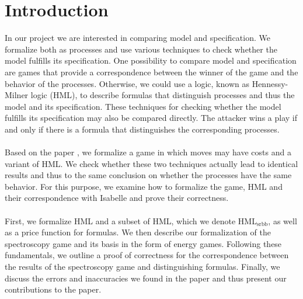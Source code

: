 \newpage
\section{Introduction}
In our project we are interested in comparing model and specification.
We formalize both as processes and use various techniques to check whether the model fulfills its specification.
One possibility to compare model and specification are games that provide a correspondence between the winner of the game and the behavior of the processes.
Otherwise, we could use a logic, known as Hennessy-Milner logic (HML), to describe formulas that distinguish processes and thus the model and its specification.
These techniques for checking whether the model fulfills its specification may also be compared directly.
The attacker wins a play if and only if there is a formula that distinguishes the corresponding processes.
\\\\
Based on the paper \cite{bisping2023lineartimebranchingtime}, we formalize a game in which moves may have costs and a variant of HML.
We check whether these two techniques actually lead to identical results and thus to the same conclusion on whether the processes have the same behavior.
For this purpose, we examine how to formalize the game, HML and their correspondence with Isabelle and prove their correctness.
\\\\
First, we formalize HML and a subset of HML, which we denote HML$_\text{srbb}$, as well as a price function for formulas.
We then describe our formalization of the spectroscopy game and its basis in the form of energy games.
Following these fundamentals, we outline a proof of correctness for the correspondence between the results of the spectroscopy game and distinguishing formulas.
Finally, we discuss the errors and inaccuracies we found in the paper and thus present our contributions to the paper\cite{bisping2023lineartimebranchingtime}.